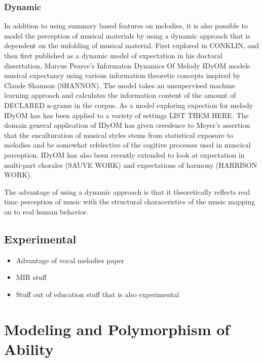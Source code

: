 \documentclass[]{book}
\providecommand{\tightlist}{%
  \setlength{\itemsep}{0pt}\setlength{\parskip}{0pt}}
\theoremstyle{definition}
\theoremstyle{definition}
\theoremstyle{definition}
\theoremstyle{remark}
\begin{document}
\hypertarget{dynamic}{%
\subsubsection{Dynamic}\label{dynamic}}

In addition to using summary based features on melodies, it is also
possible to model the perception of musical materials by using a dynamic
approach that is dependent on the unfolding of musical material. First
explored in CONKLIN, and then first published as a dynamic model of
expectation in his doctoral dissertation, Marcus Pearce's Informaton
Dynamics Of Melody IDyOM models musical expectancy using various
information theoretic concepts inspired by Claude Shannon (SHANNON). The
model takes an unsupervised machine learning approach and calculates the
information content of the amount of DECLARED n-grams in the corpus. As
a model exploring expection for melody IDyOM has has been applied to a
variety of settings LIST THEM HERE. The domain general application of
IDyOM has given creedence to Meyer's assertion that the enculturation of
musical styles stems from statistical exposure to melodies and be
somewhat refelective of the cogitive processes used in muscical
perception. IDyOM has also been recently extended to look at expectation
in multi-part chorales (SAUVE WORK) and expectations of harmony
(HARRISON WORK).

\citep{pearceAuditoryExpectationInformation2012a, pearceStatisticalLearningProbabilistic2018}

The advantage of using a dynamic approach is that it theoretically
reflects real time perception of music with the structural
characeristics of the music mapping on to real human behavior.

\hypertarget{experimental}{%
\subsection{Experimental}\label{experimental}}

\begin{itemize}
\tightlist
\item
  Advantage of vocal melodies paper
\item
  MIR stuff
\item
  Stuff out of education stuff that is also experimental
\end{itemize}

\hypertarget{modeling-and-polymorphism-of-ability}{%
\section{Modeling and Polymorphism of
Ability}\label{modeling-and-polymorphism-of-ability}}
\end{document}
